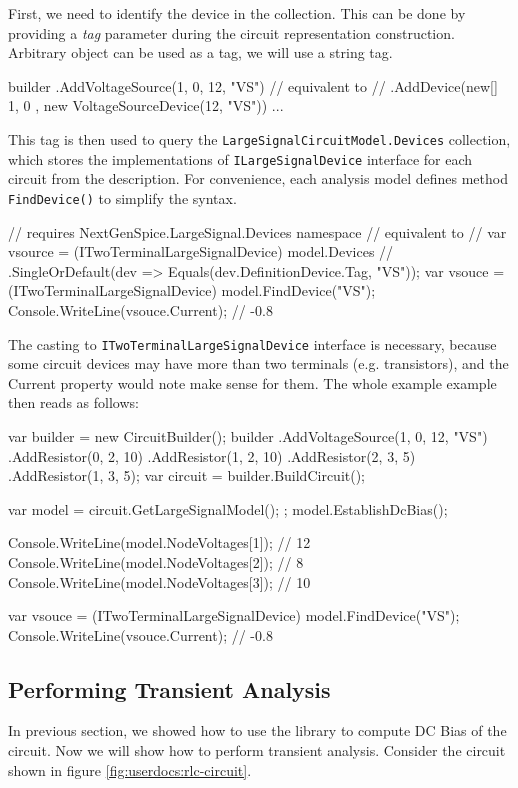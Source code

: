 First, we need to identify the device in the collection. This can be done by providing a \textit{tag} parameter during the circuit representation construction. Arbitrary object can be used as a tag, we will use a string tag.

\begin{csharpcode}
builder
	.AddVoltageSource(1, 0, 12, "VS")
//	equivalent to
//  .AddDevice(new[] { 1, 0 }, new VoltageSourceDevice(12, "VS"))
	...
\end{csharpcode}

This tag is then used to query the \texttt{LargeSignalCircuitModel.Devices} collection, which stores the implementations of \texttt{ILargeSignalDevice} interface for each circuit from the description. For convenience, each analysis model defines method \texttt{FindDevice()} to simplify the syntax.

\begin{csharpcode}
// requires NextGenSpice.LargeSignal.Devices namespace
// equivalent to
// var vsource = (ITwoTerminalLargeSignalDevice) model.Devices
//	.SingleOrDefault(dev => Equals(dev.DefinitionDevice.Tag, "VS"));
var vsouce = (ITwoTerminalLargeSignalDevice) model.FindDevice("VS");
Console.WriteLine(vsouce.Current); // -0.8
\end{csharpcode}

The casting to \texttt{ITwoTerminalLargeSignalDevice} interface is necessary, because some circuit devices may have more than two terminals (e.g. transistors), and the Current property would note make sense for them. The whole example example then reads as follows:

\begin{csharpcode}
var builder = new CircuitBuilder();
builder
.AddVoltageSource(1, 0, 12, "VS")
.AddResistor(0, 2, 10)
.AddResistor(1, 2, 10)
.AddResistor(2, 3, 5)
.AddResistor(1, 3, 5);
var circuit = builder.BuildCircuit();

var model = circuit.GetLargeSignalModel(); ;
model.EstablishDcBias();

Console.WriteLine(model.NodeVoltages[1]); // 12
Console.WriteLine(model.NodeVoltages[2]); //  8
Console.WriteLine(model.NodeVoltages[3]); // 10

var vsouce = (ITwoTerminalLargeSignalDevice) model.FindDevice("VS");
Console.WriteLine(vsouce.Current); // -0.8
\end{csharpcode}

\subsection{Performing Transient Analysis}
\label{chap:tutorial-transient}
In previous section, we showed how to use the library to compute DC Bias of the circuit. Now we will show how to perform transient analysis. Consider the circuit shown in figure \ref{fig:userdocs:rlc-circuit}.

